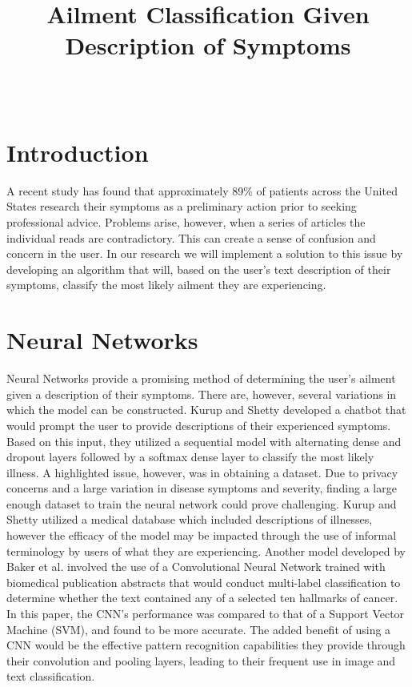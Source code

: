 \documentclass[12pt, final, onecolumn, comsoc, conference]{IEEEtran}
\begin{document}
\title{Ailment Classification Given Description of Symptoms}
\author{
	\\
}

\maketitle
\section{Introduction}
A recent study has found that approximately 89\% of patients across the United States
research their symptoms as a preliminary action prior to seeking professional advice.
Problems arise, however, when a series of articles the individual reads are contradictory.
This can create a sense of confusion and concern in the user.
In our research we will implement a solution to this issue by developing an algorithm that will,
based on the user's text description of their symptoms, classify the most likely ailment
they are experiencing.

\section{Neural Networks}
Neural Networks provide a promising method of determining the user’s ailment given a description of their symptoms.
There are, however, several variations in which the model can be constructed.
Kurup and Shetty developed a chatbot that would prompt the user to provide descriptions of their experienced symptoms.
Based on this input, they utilized a sequential model with alternating dense and dropout layers followed by a softmax dense layer to classify the most likely illness.
A highlighted issue, however, was in obtaining a dataset.
Due to privacy concerns and a large variation in disease symptoms and severity, finding a large enough dataset to train the neural network could prove challenging.
Kurup and Shetty utilized a medical database which included descriptions of illnesses, however the efficacy of the model may be impacted through the use of informal terminology by users of what they are experiencing.
Another model developed by Baker et al. involved the use of a Convolutional Neural Network trained with biomedical publication abstracts that would conduct multi-label classification to determine whether the text contained any of a selected ten hallmarks of cancer.
In this paper, the CNN’s performance was compared to that of a Support Vector Machine (SVM), and found to be more accurate.
The added benefit of using a CNN would be the effective pattern recognition capabilities they provide through their convolution and pooling layers, leading to their frequent use in image and text classification.
\end{document}

